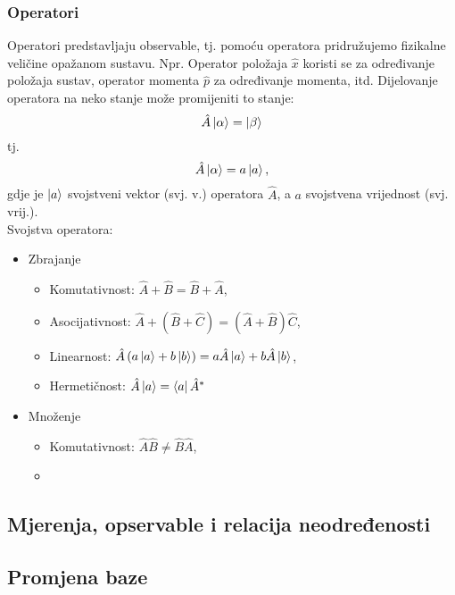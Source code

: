 \documentclass{article}
\numberwithin{equation}{section}
\begin{document}
\subsubsection{Operatori}
Operatori predstavljaju observable, tj. pomoću operatora pridružujemo fizikalne veličine opažanom sustavu. Npr. Operator položaja $\hat{x}$
koristi se za određivanje položaja sustav, operator momenta $\hat{p}$ za određivanje momenta, itd.
Dijelovanje operatora na neko stanje može promijeniti to stanje:
\begin{equation}
	\hat{A}\ket{\alpha} = \ket{\beta}
\end{equation}
tj.
\begin{equation}
\hat{A}\ket{\alpha} = a \ket{a},
\end{equation}
gdje je $\ket{a}$ svojstveni vektor (svj. v.) operatora $\hat{A}$, a $a$ svojstvena vrijednost (svj. vrij.).\\

Svojstva operatora:
\begin{itemize}
	\item Zbrajanje
	\begin{itemize}
	\item Komutativnost: $\hat{A} + \hat{B} = \hat{B} + \hat{A}$,
	\item Asocijativnost: $\hat{A} + \left(\hat{B} + \hat{C}\right) = \left(\hat{A} + \hat{B} \right) \hat{C}$,
	\item Linearnost: $\hat{A}\left(a\ket{a}+b\ket{b}\right) = a\hat{A}\ket{a} + b\hat{A}\ket{b}$,
	\item Hermetičnost: $\hat{A}\ket{a} = \bra{a}\hat{A}^*$
	\end{itemize}
\item Množenje
	\begin{itemize}
		\item Komutativnost: $\hat{A}\hat{B} \ne \hat{B} \hat{A}$,
		\item 
	\end{itemize}

\end{itemize}


\subsection{Mjerenja, opservable i relacija neodređenosti}

\subsection{Promjena baze}
\end{document}
